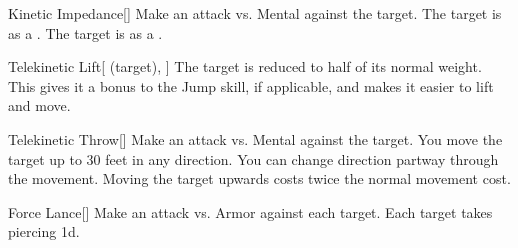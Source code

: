 \lowercase{\hypertarget{spell:Kinetic Impedance}{}}\label{spell:Kinetic Impedance}
\begin{freeability}[\nth{1}]{\hypertarget{spell:Kinetic Impedance}{Kinetic Impedance}}[]
Make an attack vs. Mental against the target.
\hit The target is  as a .
\crit The target is  as a .
\end{freeability}
\vspace{0.25em}



\lowercase{\hypertarget{spell:Telekinetic Lift}{}}\label{spell:Telekinetic Lift}
\begin{attuneability}[\nth{1}]{\hypertarget{spell:Telekinetic Lift}{Telekinetic Lift}}[ (target), ]
The target is reduced to half of its normal weight.
This gives it a  bonus to the Jump skill, if applicable, and makes it easier to lift and move.
\end{attuneability}
\vspace{0.25em}



\lowercase{\hypertarget{spell:Telekinetic Throw}{}}\label{spell:Telekinetic Throw}
\begin{freeability}[\nth{1}]{\hypertarget{spell:Telekinetic Throw}{Telekinetic Throw}}[]
Make an attack vs. Mental against the target.
\hit You move the target up to 30 feet in any direction.
You can change direction partway through the movement.
Moving the target upwards costs twice the normal movement cost.
\end{freeability}
\vspace{0.25em}



\lowercase{\hypertarget{spell:Force Lance}{}}\label{spell:Force Lance}
\begin{freeability}[\nth{2}]{\hypertarget{spell:Force Lance}{Force Lance}}[]
Make an attack vs. Armor against each target.
\hit Each target takes piercing  \plus1d.
\end{freeability}
\vspace{0.25em}




